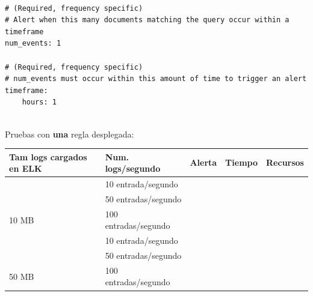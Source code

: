 \begin{verbatim}

# (Required, frequency specific)
# Alert when this many documents matching the query occur within a timeframe
num_events: 1

# (Required, frequency specific)
# num_events must occur within this amount of time to trigger an alert
timeframe:
    hours: 1
    
\end{verbatim}

Pruebas con \textbf{una} regla desplegada:

\begin{table}[H]
\begin{tabular}{|l|l|l|l|l|}
\hline
\rowcolor[HTML]{ECF4FF} 
{\color[HTML]{000000} \textbf{Tam logs cargados en ELK}} & {\color[HTML]{000000} \textbf{Num. logs/segundo}} & {\color[HTML]{000000} \textbf{Alerta}} & {\color[HTML]{000000} \textbf{Tiempo}} & {\color[HTML]{000000} \textbf{Recursos}} \\ \hline
                                                         & 10 entrada/segundo                                &                                        &                                        &                                                 \\ \cline{2-5} 
                                                         & 50 entradas/segundo                               &                                        &                                        &                                                 \\ \cline{2-5} 
\multirow{-3}{*}{10 MB}                                  & 100 entradas/segundo                              &                                        &                                        &                                                 \\ \hline
                                                         & 10 entrada/segundo                                &                                        &                                        &                                                 \\ \cline{2-5} 
                                                         & 50 entradas/segundo                               &                                        &                                        &                                                 \\ \cline{2-5} 
\multirow{-3}{*}{50 MB}                                  & 100 entradas/segundo                              &                                        &                                        &                                                 \\ \hline

\end{tabular}
\end{table}
